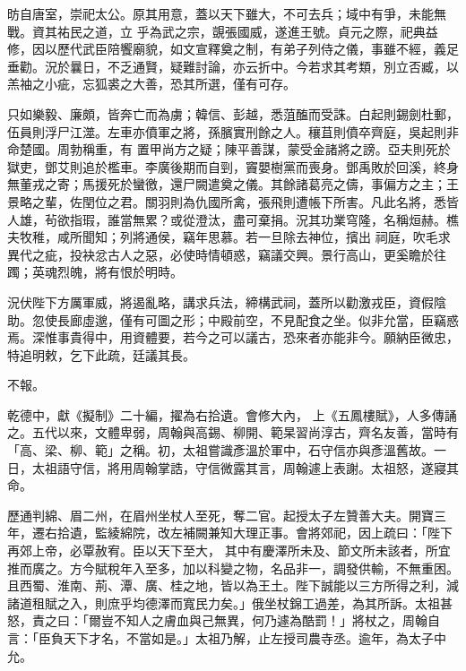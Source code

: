 \begin{pinyinscope}
 昉自唐室，崇祀太公。原其用意，蓋以天下雖大，不可去兵；域中有爭，未能無戰。資其祐民之道，立
 乎為武之宗，覬張國威，遂進王號。貞元之際，祀典益修，因以歷代武臣陪饗廟貌，如文宣釋奠之制，有弟子列侍之儀，事雖不經，義足垂勸。況於曩日，不乏通賢，疑難討論，亦云折中。今若求其考類，別立否臧，以羔袖之小疵，忘狐裘之大善，恐其所選，僅有可存。



 只如樂毅、廉頗，皆奔亡而為虜；韓信、彭越，悉菹醢而受誅。白起則錫劍杜郵，伍員則浮尸江澨。左車亦僨軍之將，孫臏實刑餘之人。穰苴則僨卒齊庭，吳起則非命楚國。周勃稱重，有
 置甲尚方之疑；陳平善謀，蒙受金諸將之謗。亞夫則死於獄吏，鄧艾則追於檻車。李廣後期而自剄，竇嬰樹黨而喪身。鄧禹敗於回溪，終身無董戎之寄；馬援死於蠻徼，還尸闕遣奠之儀。其餘諸葛亮之儔，事偏方之主；王景略之輩，佐閏位之君。關羽則為仇國所禽，張飛則遭帳下所害。凡此名將，悉皆人雄，茍欲指瑕，誰當無累？或從澄汰，盡可棄捐。況其功業穹隆，名稱烜赫。樵夫牧稚，咸所聞知；列將通侯，竊年思慕。若一旦除去神位，擯出
 祠庭，吹毛求異代之疵，投袂忿古人之惡，必使時情頓惑，竊議交興。景行高山，更奚瞻於往躅；英魂烈魄，將有恨於明時。



 況伏陛下方厲軍威，將遏亂略，講求兵法，締構武祠，蓋所以勸激戎臣，資假陰助。忽使長廊虛邈，僅有可圖之形；中殿前空，不見配食之坐。似非允當，臣竊惑焉。深惟事貴得中，用資體要，若今之可以議古，恐來者亦能非今。願納臣微忠，特追明敕，乞下此疏，廷議其長。



 不報。



 乾德中，獻《擬制》二十編，擢為右拾遺。會修大內，
 上《五鳳樓賦》，人多傳誦之。五代以來，文體卑弱，周翰與高錫、柳開、範杲習尚淳古，齊名友善，當時有「高、梁、柳、範」之稱。初，太祖嘗識彥溫於軍中，石守信亦與彥溫舊故。一日，太祖語守信，將用周翰掌誥，守信微露其言，周翰遽上表謝。太祖怒，遂寢其命。



 歷通判綿、眉二州，在眉州坐杖人至死，奪二官。起授太子左贊善大夫。開寶三年，遷右拾遺，監綾綿院，改左補闕兼知大理正事。會將郊祀，因上疏曰：「陛下再郊上帝，必覃赦宥。臣以天下至大，
 其中有慶澤所未及、節文所未該者，所宜推而廣之。方今賦稅年入至多，加以科變之物，名品非一，調發供輸，不無重困。且西蜀、淮南、荊、潭、廣、桂之地，皆以為王土。陛下誠能以三方所得之利，減諸道租賦之入，則庶乎均德澤而寬民力矣。」俄坐杖錦工過差，為其所訴。太祖甚怒，責之曰：「爾豈不知人之膚血與己無異，何乃遽為酷罰！」將杖之，周翰自言：「臣負天下才名，不當如是。」太祖乃解，止左授司農寺丞。逾年，為太子中允。




\end{pinyinscope}
